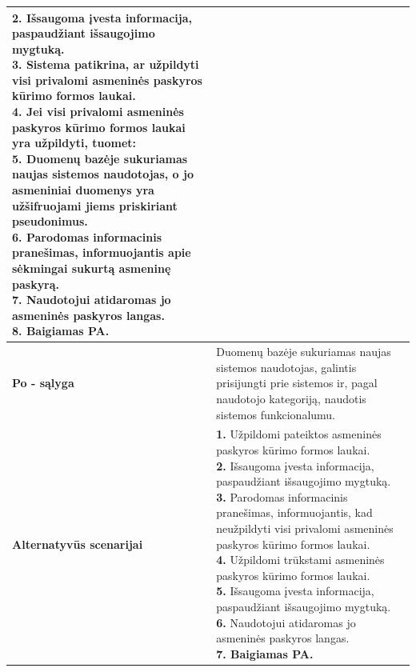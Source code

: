 \documentclass[12pt]{article}
\begin{document}
\begin{table}[htb!]
\begin{tabular}{|m{2.9cm}|m{14.3cm}|}
{{            \textbf{2.} \textcolor{dartmouthgreen}{Išsaugoma įvesta
            informacija, paspaudžiant išsaugojimo mygtuką.} \\
            \textbf{3.} Sistema patikrina, ar užpildyti visi privalomi asmeninės
            paskyros kūrimo formos laukai.
            \\
            \textbf{4.} {Jei visi privalomi asmeninės paskyros kūrimo formos
            laukai yra užpildyti, tuomet:} \\
            \textbf{5.} {Duomenų bazėje sukuriamas naujas sistemos naudotojas, o
            jo asmeniniai duomenys yra užšifruojami jiems priskiriant
            pseudonimus.} \\
            \textbf{6.} {Parodomas informacinis
            pranešimas, informuojantis apie sėkmingai sukurtą asmeninę
            paskyrą.} \\
            \textbf{7.} {Naudotojui atidaromas jo asmeninės paskyros langas.} \\
            \textbf{8. Baigiamas PA.}
        }}
        \\
        \hline
        \raggedleft \textbf{\cellcolor{deepchampagne}Po - sąlyga} &
        Duomenų bazėje sukuriamas naujas sistemos naudotojas, galintis
        prisijungti prie sistemos ir, pagal naudotojo kategoriją, naudotis
        sistemos funkcionalumu. \\
        \hline
        \raggedleft \textbf{\cellcolor{deepchampagne}Alternatyvūs scenarijai} &
        \vskip 5pt
        \makecell[l]{\parbox[t]{13.7cm}{
            \textbf{1.} \textcolor{dartmouthgreen}{Užpildomi pateiktos
            asmeninės paskyros kūrimo formos laukai.} \\
            \textbf{2.} \textcolor{dartmouthgreen}{Išsaugoma įvesta
            informacija, paspaudžiant išsaugojimo mygtuką.} \\
            \textbf{3.} Parodomas informacinis pranešimas, informuojantis, kad
            neužpildyti visi privalomi asmeninės paskyros kūrimo formos
            laukai. \\
            \textbf{4.} \textcolor{dartmouthgreen}{Užpildomi trūkstami
            asmeninės paskyros kūrimo formos laukai.} \\
            \textbf{5.} \textcolor{dartmouthgreen}{Išsaugoma įvesta
            informacija, paspaudžiant išsaugojimo mygtuką.} \\
            \textbf{6.} {Naudotojui atidaromas jo asmeninės paskyros langas.} \\
            \textbf{7. Baigiamas PA.}
        }}
        \\
        \hline
    \end{tabular}
\end{table}
\end{document}
